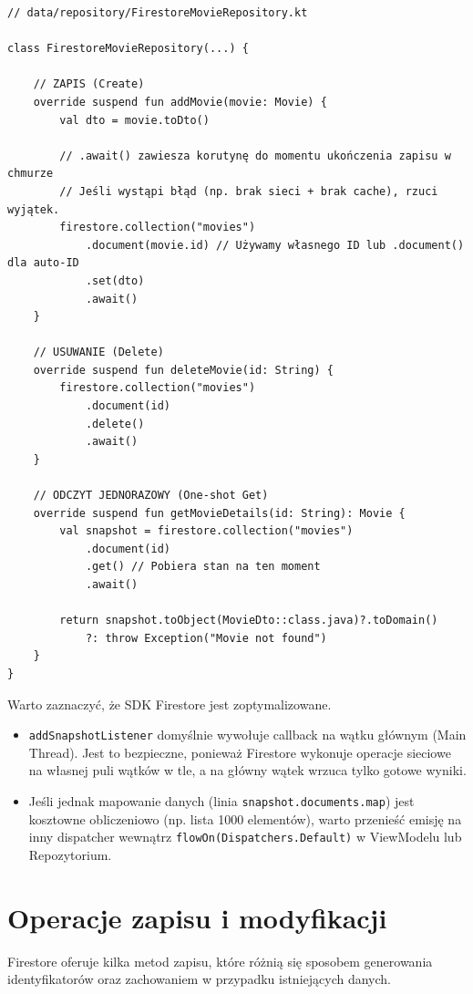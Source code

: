 \begin{verbatim}
// data/repository/FirestoreMovieRepository.kt

class FirestoreMovieRepository(...) {

    // ZAPIS (Create)
    override suspend fun addMovie(movie: Movie) {
        val dto = movie.toDto()
        
        // .await() zawiesza korutynę do momentu ukończenia zapisu w chmurze
        // Jeśli wystąpi błąd (np. brak sieci + brak cache), rzuci wyjątek.
        firestore.collection("movies")
            .document(movie.id) // Używamy własnego ID lub .document() dla auto-ID
            .set(dto)
            .await() 
    }

    // USUWANIE (Delete)
    override suspend fun deleteMovie(id: String) {
        firestore.collection("movies")
            .document(id)
            .delete()
            .await()
    }
    
    // ODCZYT JEDNORAZOWY (One-shot Get)
    override suspend fun getMovieDetails(id: String): Movie {
        val snapshot = firestore.collection("movies")
            .document(id)
            .get() // Pobiera stan na ten moment
            .await()
            
        return snapshot.toObject(MovieDto::class.java)?.toDomain() 
            ?: throw Exception("Movie not found")
    }
}
\end{verbatim}

Warto zaznaczyć, że SDK Firestore jest zoptymalizowane.
\begin{itemize}
    \item \texttt{addSnapshotListener} domyślnie wywołuje callback na wątku głównym (Main Thread). Jest to bezpieczne, ponieważ Firestore wykonuje operacje sieciowe na własnej puli wątków w tle, a na główny wątek wrzuca tylko gotowe wyniki.
    \item Jeśli jednak mapowanie danych (linia \texttt{snapshot.documents.map}) jest kosztowne obliczeniowo (np. lista 1000 elementów), warto przenieść emisję na inny dispatcher wewnątrz \texttt{flowOn(Dispatchers.Default)} w ViewModelu lub Repozytorium.
\end{itemize}

\section{Operacje zapisu i modyfikacji}

Firestore oferuje kilka metod zapisu, które różnią się sposobem generowania identyfikatorów oraz zachowaniem w przypadku istniejących danych.

